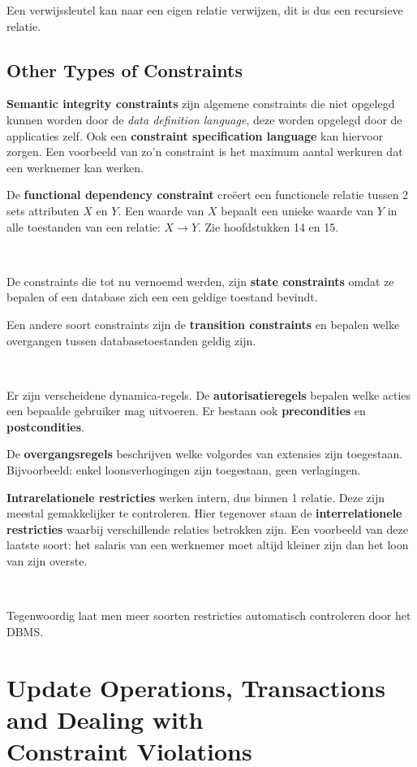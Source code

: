 \noindent Een verwijssleutel kan naar een eigen relatie verwijzen, dit is dus een recursieve relatie.

\subsection{Other Types of Constraints}
\textbf{Semantic integrity constraints} zijn algemene constraints die niet opgelegd kunnen worden door de \textit{data definition language}, deze worden opgelegd door de applicaties zelf. Ook een \textbf{constraint specification language} kan hiervoor zorgen. Een voorbeeld van zo'n constraint is het maximum aantal werkuren dat een werknemer kan werken.

De \textbf{functional dependency constraint} cre\"eert een functionele relatie tussen 2 sets attributen $X$ en $Y$. Een waarde van $X$ bepaalt een unieke waarde van $Y$ in alle toestanden van een relatie: $X \rightarrow Y$. Zie hoofdstukken 14 en 15.

~

\noindent De constraints die tot nu vernoemd werden, zijn \textbf{state constraints} omdat ze bepalen of een database zich een een geldige toestand bevindt.

Een andere soort constraints zijn de \textbf{transition constraints} en bepalen welke overgangen tussen databasetoestanden geldig zijn.

~

\noindent Er zijn verscheidene dynamica-regels. De \textbf{autorisatieregels} bepalen welke acties een bepaalde gebruiker mag uitvoeren. Er bestaan ook \textbf{precondities} en \textbf{postcondities}.

De \textbf{overgangsregels} beschrijven welke volgordes van extensies zijn toegestaan. Bijvoorbeeld: enkel loonsverhogingen zijn toegestaan, geen verlagingen.

\textbf{Intrarelationele restricties} werken intern, dus binnen 1 relatie. Deze zijn meestal gemakkelijker te controleren. Hier tegenover staan de \textbf{interrelationele restricties} waarbij verschillende relaties betrokken zijn. Een voorbeeld van deze laatste soort: het salaris van een werknemer moet altijd kleiner zijn dan het loon van zijn overste.

~

\noindent Tegenwoordig laat men meer soorten restricties automatisch controleren door het DBMS.

\section[Update Operations, Transactions and Dealing with Constraint Violations]{Update Operations, Transactions and Dealing with\\Constraint Violations}

